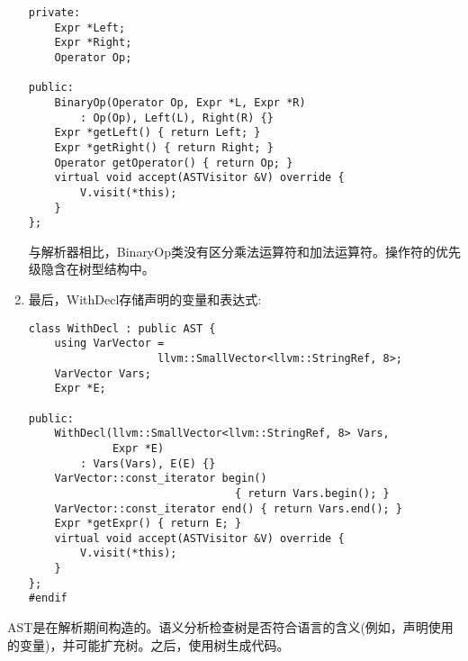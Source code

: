 \begin{enumerate}
\begin{lstlisting}[caption={}]
private:
	Expr *Left;
	Expr *Right;
	Operator Op;
	
public:
	BinaryOp(Operator Op, Expr *L, Expr *R)
		: Op(Op), Left(L), Right(R) {}
	Expr *getLeft() { return Left; }
	Expr *getRight() { return Right; }
	Operator getOperator() { return Op; }
	virtual void accept(ASTVisitor &V) override {
		V.visit(*this);
	}
};	
\end{lstlisting}
与解析器相比，BinaryOp类没有区分乘法运算符和加法运算符。操作符的优先级隐含在树型结构中。

\item 最后，WithDecl存储声明的变量和表达式:
\begin{lstlisting}[caption={}]
class WithDecl : public AST {
	using VarVector =
					llvm::SmallVector<llvm::StringRef, 8>;
	VarVector Vars;
	Expr *E;
	
public:
	WithDecl(llvm::SmallVector<llvm::StringRef, 8> Vars,
			 Expr *E)
		: Vars(Vars), E(E) {}
	VarVector::const_iterator begin()
								{ return Vars.begin(); }
	VarVector::const_iterator end() { return Vars.end(); }
	Expr *getExpr() { return E; }
	virtual void accept(ASTVisitor &V) override {
		V.visit(*this);
	}
};
#endif	
\end{lstlisting}

\end{enumerate}

AST是在解析期间构造的。语义分析检查树是否符合语言的含义(例如，声明使用的变量)，并可能扩充树。之后，使用树生成代码。
